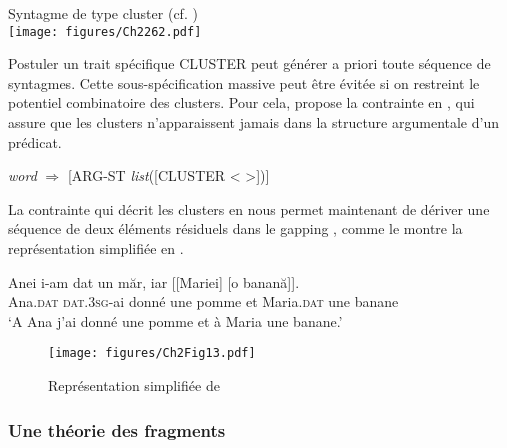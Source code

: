 \ea \label{ch2:ex262}
Syntagme de type cluster (cf. \citealt{Mouret2006,Mouret2007})\\
\texttt{[image: figures/Ch2262.pdf]}


\z

Postuler un trait spécifique CLUSTER peut générer a priori toute séquence de syntagmes. Cette sous-spécification massive peut être évitée si on restreint le potentiel combinatoire des clusters. Pour cela, \citet{Mouret2007} propose la contrainte en , qui assure que les clusters n’apparaissent jamais dans la structure argumentale d’un prédicat.  

\ea \label{ch2:ex263}
\textit{word} $\Rightarrow$ [ARG-ST \textit{list}([CLUSTER < >])]
\z

La contrainte qui décrit les clusters en  nous permet maintenant de dériver une séquence de deux éléments résiduels dans le gapping , comme le montre la représentation simplifiée en .

\ea \label{ch2:ex264}
\gll Anei  i-am  dat  un  măr,  iar  [[Mariei]  [o  banană]].\\ 
Ana.\textsc{dat} \textsc{dat.3sg}{}-ai  donné  une  pomme  et  Maria.\textsc{dat}  une  banane\\
\glt ‘A Ana j’ai donné une pomme et à Maria une banane.’
\z


\begin{figure} 

   \texttt{[image: figures/Ch2Fig13.pdf]}

\caption{Représentation simplifiée de }
\label{ch2:fig13}
\end{figure}


\subsubsection{Une théorie des fragments} \label{ch2:sect2.5.3.2}

